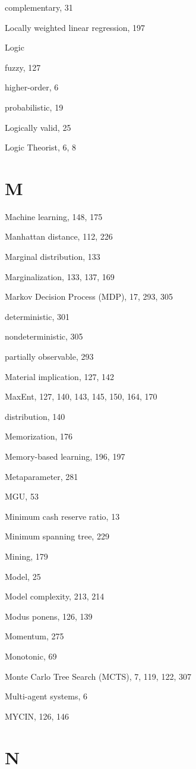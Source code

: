 \documentclass[10pt]{book}
\begin{document}
\begin{center}
complementary, 31

Locally weighted linear regression, 197

Logic

fuzzy, 127

higher-order, 6

probabilistic, 19

Logically valid, 25

Logic Theorist, 6, 8
\section{M}

Machine learning, 148, 175

Manhattan distance, 112, 226

Marginal distribution, 133

Marginalization, 133, 137, 169

Markov Decision Process (MDP), 17, 293, 305

deterministic, 301

nondeterministic, 305

partially observable, 293

Material implication, 127, 142

MaxEnt, 127, 140, 143, 145, 150, 164, 170

distribution, 140

Memorization, 176

Memory-based learning, 196, 197

Metaparameter, 281

MGU, 53

Minimum cash reserve ratio, 13

Minimum spanning tree, 229

Mining, 179

Model, 25

Model complexity, 213, 214

Modus ponens, 126, 139

Momentum, 275

Monotonic, 69

Monte Carlo Tree Search (MCTS), 7, 119, 122, 307

Multi-agent systems, 6

MYCIN, 126, 146

\section{N}


\end{center}
\end{document}
